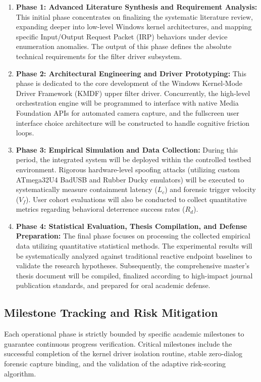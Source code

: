 \documentclass{ieeeaccess}
\begin{document}
\begin{enumerate}
    \item \textbf{Phase 1: Advanced Literature Synthesis and Requirement Analysis:} This initial phase concentrates on finalizing the systematic literature review, expanding deeper into low-level Windows kernel architectures, and mapping specific Input/Output Request Packet (IRP) behaviors under device enumeration anomalies. The output of this phase defines the absolute technical requirements for the filter driver subsystem.
    \item \textbf{Phase 2: Architectural Engineering and Driver Prototyping:} This phase is dedicated to the core development of the Windows Kernel-Mode Driver Framework (KMDF) upper filter driver. Concurrently, the high-level orchestration engine will be programmed to interface with native Media Foundation APIs for automated camera capture, and the fullscreen user interface choice architecture will be constructed to handle cognitive friction loops.
    \item \textbf{Phase 3: Empirical Simulation and Data Collection:} During this period, the integrated system will be deployed within the controlled testbed environment. Rigorous hardware-level spoofing attacks (utilizing custom ATmega32U4 BadUSB and Rubber Ducky emulators) will be executed to systematically measure containment latency ($L_c$) and forensic trigger velocity ($V_f$). User cohort evaluations will also be conducted to collect quantitative metrics regarding behavioral deterrence success rates ($R_d$).
    \item \textbf{Phase 4: Statistical Evaluation, Thesis Compilation, and Defense Preparation:} The final phase focuses on processing the collected empirical data utilizing quantitative statistical methods. The experimental results will be systematically analyzed against traditional reactive endpoint baselines to validate the research hypotheses. Subsequently, the comprehensive master's thesis document will be compiled, finalized according to high-impact journal publication standards, and prepared for oral academic defense.
\end{enumerate}

\subsection{Milestone Tracking and Risk Mitigation}
Each operational phase is strictly bounded by specific academic milestones to guarantee continuous progress verification. Critical milestones include the successful completion of the kernel driver isolation routine, stable zero-dialog forensic capture binding, and the validation of the adaptive risk-scoring algorithm. 
\end{document}
